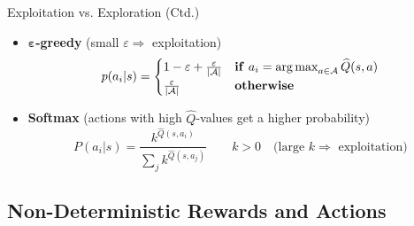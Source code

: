 \begin{frame}{Exploitation vs. Exploration (Ctd.)}{}
	\begin{itemize}
		\item $\bm{\varepsilon}$\textbf{-greedy} (small $\varepsilon \Rightarrow$ exploitation)
		\begin{equation}
			p(a_i \vert s) =
			\begin{cases}
				1 - \varepsilon + \frac{\varepsilon}{\vert \mathcal{A} \vert} & 
					\text{\textbf{if}}\ a_i = \operatorname*{arg\,max}_{a \in \mathcal{A}} \widehat{Q}(s, a) \\
				\frac{\varepsilon}{\vert \mathcal{A} \vert} &
					\text{\textbf{otherwise}}
			\end{cases}
		\end{equation}
		\item \textbf{Softmax} (actions with high $\widehat{Q}$-values get a higher probability)
		\begin{equation}
			P(a_i \vert s) = \frac{k^{\widehat{Q}(s, a_i)}}{\sum_j k^{\widehat{Q}(s, a_j)}}
			\qquad k > 0 \quad \text{(large $k \Rightarrow$ exploitation)}
		\end{equation}
	\end{itemize}
\end{frame}


\subsection{Non-Deterministic Rewards and Actions}

